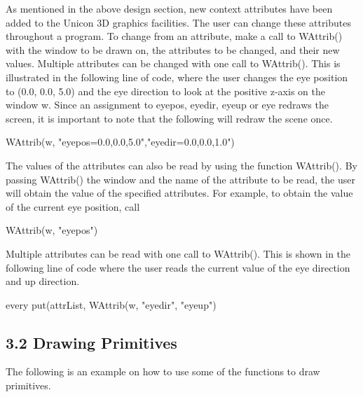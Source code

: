 \documentclass[letterpaper]{article}
\begin{document}
As mentioned in the above design section, new context attributes have
been added to the Unicon 3D graphics facilities.  The user can change
these attributes throughout a program. To change from an attribute,
make a call to \textsf{WAttrib()} with the window to be drawn on, the
attributes to be changed, and their new values. Multiple attributes
can be changed with one call to \textsf{WAttrib()}. This is
illustrated in the following line of code, where the user changes the
eye position to \textsf{(0.0, 0.0, 5.0)} and the eye direction to look
at the positive z-axis on the window w. Since an assignment to
\textsf{eyepos}, \textsf{eyedir}, \textsf{eyeup} or \textsf{eye}
redraws the screen, it is important to note that the following will
redraw the scene once.


\bigskip

{\sffamily
WAttrib(w, "eyepos=0.0,0.0,5.0","eyedir=0.0,0.0,1.0")}


\bigskip

The values of the attributes can also be read by using the function
\textsf{WAttrib()}. By passing \textsf{WAttrib()} the window
and the name of the attribute to be read, the user will obtain the
value of the specified attributes. For example, to obtain the value of
the current eye position, call


\bigskip

{\sffamily
WAttrib(w, "eyepos")}


\bigskip

Multiple attributes can be read with one call to
\textsf{WAttrib()}. This is shown in the following line of code where
the user reads the current value of the eye direction and up direction.

\bigskip

{\sffamily
every put(attrList, WAttrib(w, "eyedir", "eyeup")}


\subsection[3.2 Drawing Primitives]{3.2 Drawing Primitives}

The following is an example on how to use some of the functions to
draw primitives.

\bigskip

\end{document}
